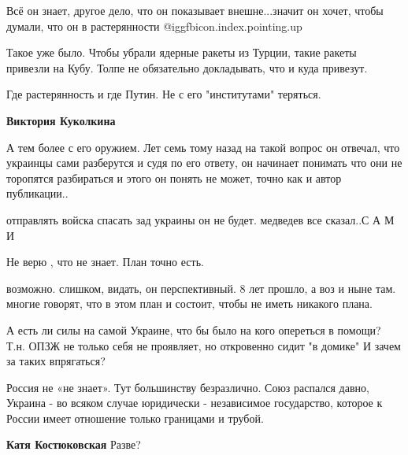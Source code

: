 \begin{itemize}

Всё он знает, другое дело, что он показывает внешне...значит он хочет, чтобы
думали, что он в растерянности @igg{fbicon.index.pointing.up}


Такое уже было. Чтобы убрали ядерные ракеты из Турции, такие ракеты привезли на
Кубу. Толпе не обязательно докладывать, что и куда привезут.


Где растерянность и где Путин. Не с его "институтами" теряться.

\begin{itemize} %
\textbf{Виктория Куколкина} 

А тем более с его оружием. Лет семь тому назад на такой вопрос он отвечал, что
украинцы сами разберутся и судя по его ответу, он начинает понимать что они не
торопятся разбираться и этого он понять не может, точно как и автор
публикации..

\end{itemize} %

отправлять войска спасать зад украины он не будет. медведев все сказал..С А М И

Не верю , что не знает. План точно есть.

\begin{itemize} %

возможно. слишком, видать, он перспективный. 8 лет прошло, а воз и ныне там.
многие говорят, что в этом план и состоит, чтобы не иметь никакого плана.

\end{itemize} %

А есть ли силы на самой Украине, что бы было на кого опереться в помощи?
Т.н. ОПЗЖ не только себя не проявляет, но откровенно сидит "в домике"
И зачем за таких впрягаться?


Россия не «не знает». Тут большинству безразлично. Союз распался давно, Украина
- во всяком случае юридически - независимое государство, которое к России имеет
отношение только границами и трубой.

\begin{itemize} %
\textbf{Катя Костюковская} Разве?
\end{itemize} %


\end{itemize}
